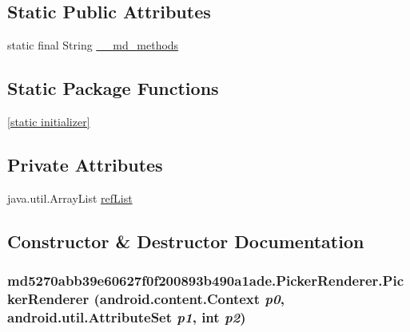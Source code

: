 \subsection*{Static Public Attributes}
\begin{CompactItemize}
\item 
static final String \hyperlink{classmd5270abb39e60627f0f200893b490a1ade_1_1_picker_renderer_74038f85b1fb16f11210e480152a004c}{\_\-\_\-md\_\-methods}
\end{CompactItemize}
\subsection*{Static Package Functions}
\begin{CompactItemize}
\item 
\hyperlink{classmd5270abb39e60627f0f200893b490a1ade_1_1_picker_renderer_7f4af5558fac1d77cc8636bb243421cf}{\mbox{[}static initializer\mbox{]}}
\end{CompactItemize}
\subsection*{Private Attributes}
\begin{CompactItemize}
\item 
java.util.ArrayList \hyperlink{classmd5270abb39e60627f0f200893b490a1ade_1_1_picker_renderer_63b7af8001f6b5d63bc7d868b9d12d4c}{refList}
\end{CompactItemize}


\subsection{Constructor \& Destructor Documentation}
\hypertarget{classmd5270abb39e60627f0f200893b490a1ade_1_1_picker_renderer_00b8590adecab516a7110fb8577fd90a}{
\subsubsection[{PickerRenderer}]{\setlength{\rightskip}{0pt plus 5cm}md5270abb39e60627f0f200893b490a1ade.PickerRenderer.PickerRenderer (android.content.Context {\em p0}, \/  android.util.AttributeSet {\em p1}, \/  int {\em p2})}}
\label{classmd5270abb39e60627f0f200893b490a1ade_1_1_picker_renderer_00b8590adecab516a7110fb8577fd90a}


